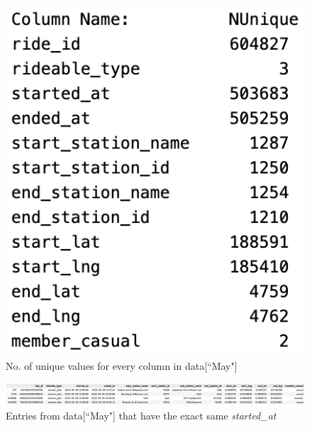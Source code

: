 \documentclass[12pt]{article}
\begin{document}
\begin{itemize}
	\begin{figure}[h]
	\centering
	\includegraphics[scale = 0.6]{imgUnique.png} %
	\caption{No. of unique values for every column in data[``May"]}
	\label{fig2}
	\end{figure}
	
	\begin{figure}[h]
	\hspace{-1.8cm}
	\includegraphics[width=8 in, height = 1 in]{imgDups1.png}
	\caption{Entries from data[``May"] that have the exact same \textit{started\_at}}
	\label{fig10}
	\end{figure}
	

\end{itemize}
\end{document}
